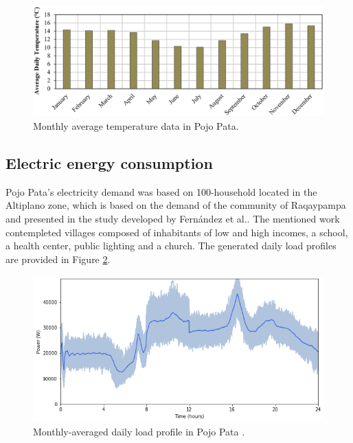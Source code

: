 \documentclass{ECOS_2019}
\begin{document}
\begin{figure}[h!]
    \centering
    \includegraphics[scale=0.467]{Figures/Temperature_data.png}
    \caption{Monthly average temperature data in Pojo Pata.}
    \label{fig_temperature_data}
\end{figure}
\subsection{Electric energy consumption}
Pojo Pata’s electricity demand was based on 100-household located in the Altiplano zone, which is based on the demand of the community of Raqaypampa and presented in the study developed by Fernández et al.\cite{Fernandez2021}. The mentioned work contempleted villages composed of inhabitants of low and high incomes, a school, a health center, public lighting and a church. The generated daily load profiles are provided in Figure \ref{fig_electric_load}.
\begin{figure}[h!]
    \centering
    \includegraphics[scale=0.71]{Figures/Electric_load.png}
    \caption{Monthly-averaged daily load profile in Pojo Pata \cite{FernandezFuentes2020}.}
    \label{fig_electric_load}
\end{figure}
\end{document}

